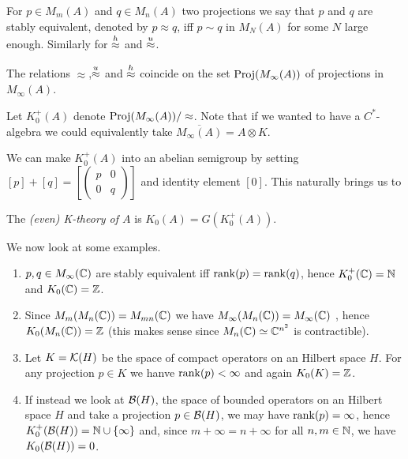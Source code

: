 \begin{definition}
 For $p\in M_m(A)$ and $q\in M_n(A)$ two projections we say that $p$ and $q$ are stably equivalent, denoted by $p\approx q$, iff $p\sim q$ in $M_N(A)$ for some $N$ large enough. Similarly for $\stackrel{h}{\approx}$ and $\stackrel{u}{\approx}$.
\end{definition}

\begin{corollary}
 The relations $\approx$,$\stackrel{u}{\approx}$ and $\stackrel{h}{\approx}$ coincide on the set $\mathrm{Proj}(M_\infty(A))$ of projections in $M_\infty(A)$.
\end{corollary}

\begin{definition}
 Let $K_0^+(A)$ denote $\mathrm{Proj}(M_\infty(A))/\approx$. Note that if we wanted to have a $C^\ast$-algebra we could equivalently take $\overline{M_\infty(A)}=A\otimes K$. 
\end{definition}

\noindent We can make $K_0^+(A)$ into an abelian semigroup by setting $[p]+[q]=\left[\begin{pmatrix}p & 0 \\ 0 & q\end{pmatrix}\right]$ and identity element $[0]$. This naturally brings us to

\begin{definition}
 The \emph{(even) K-theory of $A$} is $K_0(A)=G(K_0^+(A))$.
\end{definition}

We now look at some examples.
\begin{enumerate}
 \item $p,q\in M_\infty(\mathbb{C})$ are stably equivalent iff $\mathrm{rank}(p)=\mathrm{rank}(q)$, hence $K_0^+(\mathbb{C})=\mathbb{N}$ and $K_0(\mathbb{C})=\mathbb{Z}$.
 \item Since $M_m(M_n(\mathbb{C}))=M_{mn}(\mathbb{C})$ we have $M_\infty(M_n(\mathbb{C}))=M_\infty(\mathbb{C})$ , hence $K_0(M_n(\mathbb{C}))=\mathbb{Z}$ (this makes sense since $M_n(\mathbb{C})\simeq \mathbb{C}^{n^2}$ is contractible).
 \item Let $K=\mathcal{K}(H)$ be the space of compact operators on an Hilbert space $H$. For any projection $p\in K$ we hanve $\mathrm{rank}(p)<\infty$ and again $K_0(K)=\mathbb{Z}$.
 \item If instead we look at $\mathcal{B}(H)$, the space of bounded operators on an Hilbert space $H$ and take a projection $p\in\mathcal{B}(H)$, we may have $\mathrm{rank}(p)=\infty$, hence $K_0^+(\mathcal{B}(H))=\mathbb{N}\cup\{\infty\}$ and, since $m+\infty=n+\infty$ for all $n,m\in\mathbb{N}$, we have $K_0(\mathcal{B}(H))=0$.
\end{enumerate}

